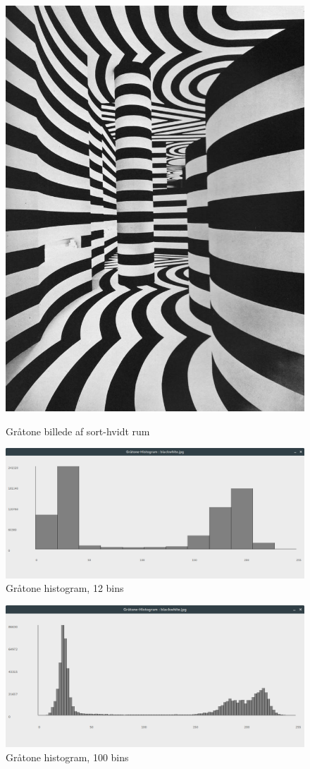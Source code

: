 \documentclass[a4paper,10pt]{article}
\begin{document}
\begin{figure}[H]
  \centering
  \begin{minipage}[b]{0.4\textwidth}
    \includegraphics[width=\textwidth]{blackwhite_gray.jpg}
    \caption{Gråtone billede af sort-hvidt rum}
  \end{minipage}
  \hfill
  \begin{minipage}[b]{0.4\textwidth}
    \includegraphics[width=\textwidth]{hist4.png}
    \caption{Gråtone histogram, 12 bins}
  \end{minipage}
\end{figure}

\begin{figure}[H]
	\centering
    	\includegraphics[width=\textwidth]{hist3.png}
    	\caption{Gråtone histogram, 100 bins}
\end{figure}
\end{document}
